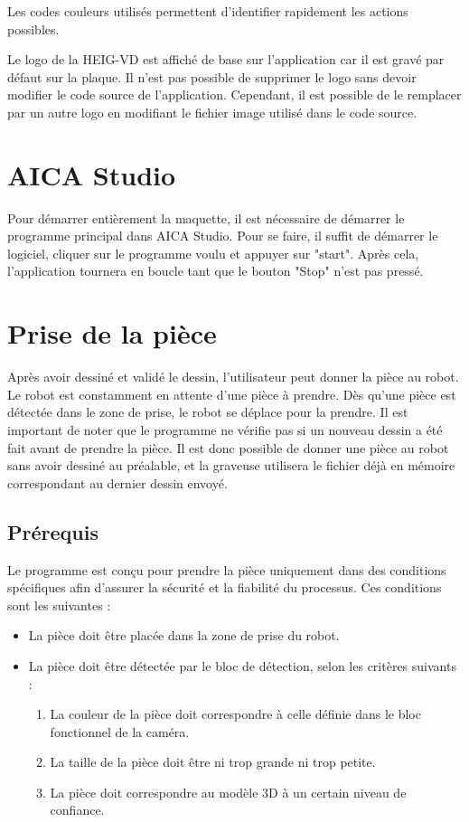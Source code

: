 Les codes couleurs utilisés permettent d'identifier rapidement les actions possibles.

Le logo de la HEIG-VD est affiché de base sur l'application car il est gravé par défaut sur la plaque. Il n'est pas possible de supprimer le logo sans devoir modifier le code source de l'application. Cependant, il est possible de le remplacer par un autre logo en modifiant le fichier image utilisé dans le code source.


\section{AICA Studio}
Pour démarrer entièrement la maquette, il est nécessaire de démarrer le programme principal dans AICA Studio. Pour se faire, il suffit de démarrer le logiciel, cliquer sur le programme voulu et appuyer sur "start". Après cela, l'application tournera en boucle tant que le bouton "Stop" n'est pas pressé.

\section{Prise de la pièce}

Après avoir dessiné et validé le dessin, l'utilisateur peut donner la pièce au robot. Le robot est constamment en attente d'une pièce à prendre. Dès qu'une pièce est détectée dans le zone de prise, le robot se déplace pour la prendre. Il est important de noter que le programme ne vérifie pas si un nouveau dessin a été fait avant de prendre la pièce. Il est donc possible de donner une pièce au robot sans avoir dessiné au préalable, et la graveuse utilisera le fichier déjà en mémoire correspondant au dernier dessin envoyé.

\subsection{Prérequis}

Le programme est conçu pour prendre la pièce uniquement dans des conditions spécifiques afin d'assurer la sécurité et la fiabilité du processus. Ces conditions sont les suivantes :
\begin{itemize}
    \item La pièce doit être placée dans la zone de prise du robot.
    \item La pièce doit être détectée par le bloc de détection, selon les critères suivants :
          \begin{enumerate}
              \item La couleur de la pièce doit correspondre à celle définie dans le bloc fonctionnel de la caméra.
              \item La taille de la pièce doit être ni trop grande ni trop petite.
              \item La pièce doit correspondre au modèle 3D à un certain niveau de confiance.
          \end{enumerate}
\end{itemize}

